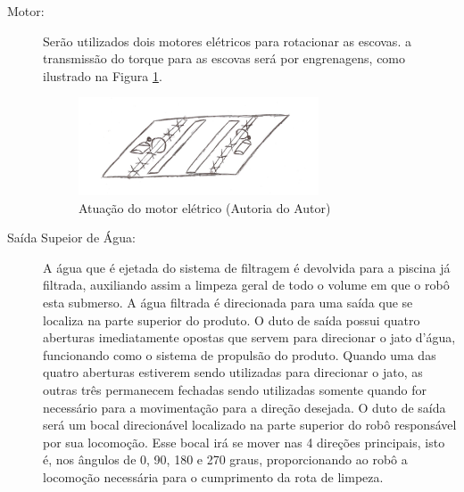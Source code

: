 \begin{description}
\item[Motor:] Serão utilizados dois motores elétricos para rotacionar as escovas.
a transmissão do torque para as escovas será por engrenagens, como ilustrado na
Figura \ref{fig:eletric-motor}.
\par
\begin{figure}[h]
  \centering
  \includegraphics[width=0.7\textwidth]{figures/eletric-motor.png}
  \caption{Atuação do motor elétrico (\textsf{Autoria do Autor})}
  \label{fig:eletric-motor}
\end{figure}
\FloatBarrier

\item[Saída Supeior de Água:] A água que é ejetada do sistema de filtragem é
devolvida para a piscina já filtrada, auxiliando assim a limpeza geral de todo
o volume em que o robô esta submerso. A água filtrada é direcionada para uma
saída que se localiza na parte superior do produto. O duto de saída possui quatro
aberturas imediatamente opostas que servem para direcionar o jato d’água,
funcionando como o sistema de propulsão do produto. Quando uma das quatro aberturas
estiverem sendo utilizadas para direcionar o jato, as outras três permanecem
fechadas sendo utilizadas somente quando for necessário para a movimentação para a
direção desejada. O duto de saída será um bocal direcionável localizado na
parte superior do robô responsável por sua locomoção. Esse bocal irá se mover
nas 4 direções principais, isto é, nos ângulos de 0, 90, 180 e 270 graus,
proporcionando ao robô a locomoção necessária para o cumprimento da rota de limpeza.


\end{description}
